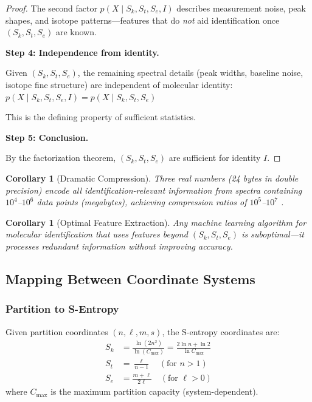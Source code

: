 \documentclass[twocolumn,10pt]{article}
\newtheorem{corollary}[theorem]{Corollary}
\begin{document}
\begin{proof}
The second factor $p(X \mid S_k, S_t, S_e, I)$ describes measurement noise, peak shapes, and isotope patterns—features that do \emph{not} aid identification once $(S_k, S_t, S_e)$ are known.

\textbf{Step 4: Independence from identity.}

Given $(S_k, S_t, S_e)$, the remaining spectral details (peak widths, baseline noise, isotope fine structure) are independent of molecular identity:
$
p(X \mid S_k, S_t, S_e, I) = p(X \mid S_k, S_t, S_e)
$

This is the defining property of sufficient statistics.

\textbf{Step 5: Conclusion.}

By the factorization theorem, $(S_k, S_t, S_e)$ are sufficient for identity $I$.
\end{proof}

\begin{corollary}[Dramatic Compression]
\label{cor:compression}
Three real numbers (24 bytes in double precision) encode all identification-relevant information from spectra containing $10^4$–$10^6$ data points (megabytes), achieving compression ratios of $10^5$–$10^7$ \citep{shannon1948mathematical,cover2006elements}.
\end{corollary}

\begin{corollary}[Optimal Feature Extraction]
\label{cor:optimal}
Any machine learning algorithm for molecular identification that uses features beyond $(S_k, S_t, S_e)$ is suboptimal—it processes redundant information without improving accuracy.
\end{corollary}

\subsection{Mapping Between Coordinate Systems}

\subsubsection{Partition to S-Entropy}

Given partition coordinates $(n, \ell, m, s)$, the S-entropy coordinates are:
\begin{align}
S_k &= \frac{\ln(2n^2)}{\ln(C_{\max})} = \frac{2\ln n + \ln 2}{\ln C_{\max}} \\
S_t &= \frac{\ell}{n-1} \quad (\text{for } n > 1) \\
S_e &= \frac{m + \ell}{2\ell} \quad (\text{for } \ell > 0)
\end{align}
where $C_{\max}$ is the maximum partition capacity (system-dependent).
\end{document}
